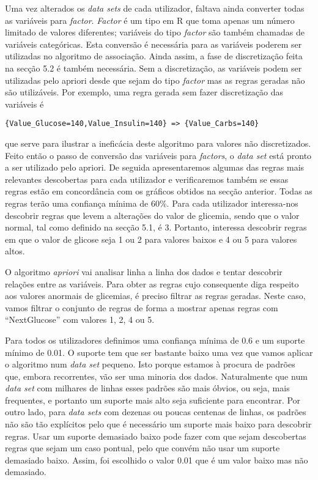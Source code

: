 Uma vez alterados os \textit{data sets} de cada utilizador, faltava ainda converter todas as variáveis para \textit{factor}. \textit{Factor} é um tipo em R que toma apenas um número limitado de valores diferentes; variáveis do tipo \textit{factor} são também chamadas de variáveis categóricas. Esta conversão é necessária para as variáveis poderem ser utilizadas no algoritmo de associação. Ainda assim, a fase de discretização feita na secção 5.2 é também necessária. Sem a discretização, as variáveis podem ser utilizadas pelo apriori desde que sejam do tipo \textit{factor} mas as regras geradas não são utilizáveis. Por exemplo, uma regra gerada sem fazer discretização das variáveis é

\begin{lstlisting}
{Value_Glucose=140,Value_Insulin=140} => {Value_Carbs=140}
\end{lstlisting}

que serve para ilustrar a ineficácia deste algoritmo para valores não discretizados. Feito então o passo de conversão das variáveis para \textit{factors}, o \textit{data set} está pronto a ser utilizado pelo apriori. De seguida apresentaremos algumas das regras mais relevantes descobertas para cada utilizador e verificaremos também se essas regras estão em concordância com os gráficos obtidos na secção anterior. Todas as regras terão uma confiança mínima de 60\%.
Para cada utilizador interessa-nos descobrir regras que levem a alterações do valor de glicemia, sendo que o valor normal, tal como definido na secção 5.1, é 3. Portanto, interessa descobrir regras em que o valor de glicose seja 1 ou 2 para valores baixos e 4 ou 5 para valores altos.

O algoritmo \textit{apriori} vai analisar linha a linha dos dados e tentar descobrir relações entre as variáveis. Para obter as regras cujo consequente diga respeito aos valores anormais de glicemias, é preciso filtrar as regras geradas. Neste caso, vamos filtrar o conjunto de regras de forma a mostrar apenas regras com ``Next\textunderscore Glucose'' com valores 1, 2, 4 ou 5. 

Para todos os utilizadores definimos uma confiança mínima de 0.6 e um suporte mínimo de 0.01. O suporte tem que ser bastante baixo uma vez que vamos aplicar o algoritmo num \textit{data set} pequeno. Isto porque estamos à procura de padrões que, embora recorrentes, vão ser uma minoria dos dados. Naturalmente que num \textit{data set} com milhares de linhas esses padrões são mais óbvios, ou seja, mais frequentes, e portanto um suporte mais alto seja suficiente para encontrar. Por outro lado, para \textit{data sets} com dezenas ou poucas centenas de linhas, os padrões não são tão explícitos pelo que é necessário um suporte mais baixo para descobrir regras. Usar um suporte demasiado baixo pode fazer com que sejam descobertas regras que sejam um caso pontual, pelo que convém não usar um suporte demasiado baixo. Assim, foi escolhido o valor 0.01 que é um valor baixo mas não demasiado. 

